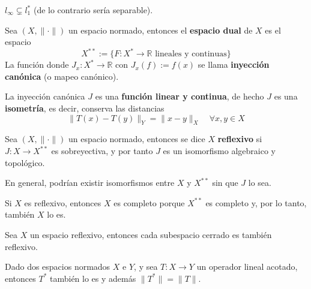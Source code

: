 \documentclass[12pt]{book}
\newcommand{\tbf}{\textbf}
\begin{document}
\begin{coro}
    $l_\infty \subsetneq l_1^*$ (de lo contrario sería separable).
\end{coro}

\begin{definicion}
    Sea $(X, \|\cdot\|)$ un espacio normado, entonces el \tbf{espacio dual} de $X$ es el espacio 
    $$X^{**} := \{ F: X^* \to \mathbb{R} \text{ lineales y continuas} \}$$
    La función 
    donde $J_x: X^* \to \mathbb{R}$ con $J_x(f) := f(x)$ se llama \textbf{inyección canónica} (o mapeo canónico).
\end{definicion}

\begin{observacion}
    La inyección canónica $J$ es una \tbf{función linear y continua}, de hecho $J$ es una \tbf{isometría}, es decir, conserva las distancias
    \begin{equation*}
        \|T(x) - T(y)\|_Y = \|x - y\|_X \quad \forall x, y \in X
    \end{equation*}
\end{observacion}




\begin{definicion}
    Sea $(X, \|\cdot\|)$ un espacio normado, entonces se dice $X$ \tbf{reflexivo} si $J: X \to X^{**}$ es sobreyectiva, y por tanto $J$ es un isomorfismo algebraico y topológico.
\end{definicion}

\begin{observacion}
    En general, podrían existir isomorfismos entre $X$ y $X^{**}$ sin que $J$ lo sea.
\end{observacion}


\begin{observacion}
    Si $X$ es reflexivo, entonces $X$ es completo porque $X^{**}$ es completo y, por lo tanto, también $X$ lo es.
\end{observacion}


\begin{prop}
    Sea $X$ un espacio reflexivo, entonces cada subespacio cerrado es también reflexivo.
\end{prop}

\begin{prop}
    Dado dos espacios normados $X$ e $Y$, y sea $T: X \to Y$ un operador lineal acotado, entonces $T^*$ también lo es y además $\|T^*\|=\|T\|$.
\end{prop}
\end{document}

